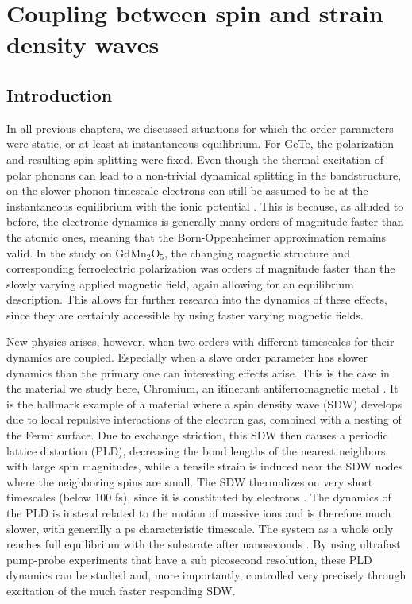 \chapter{Coupling between spin and strain density waves \label{ch:CrSDW}}
\section{Introduction}
In all previous chapters, we discussed situations for which the order parameters were static, or at least at instantaneous equilibrium.
For GeTe, the polarization and resulting spin splitting were fixed.
Even though the thermal excitation of polar phonons can lead to a non-trivial dynamical splitting in the bandstructure, on the slower phonon timescale electrons can still be assumed to be at the instantaneous equilibrium with the ionic potential \cite{Monserrat2017}.
This is because, as alluded to before, the electronic dynamics is generally many orders of magnitude faster than the atomic ones, meaning that the Born-Oppenheimer approximation remains valid.
In the study on GdMn$_2$O$_5$, the changing magnetic structure and corresponding ferroelectric polarization was orders of magnitude faster than the slowly varying applied magnetic field, again allowing for an equilibrium description.
This allows for further research into the dynamics of these effects, since they are certainly accessible by using faster varying magnetic fields.

New physics arises, however, when two orders with different timescales for their dynamics are coupled.
Especially when a slave order parameter has slower dynamics than the primary one can interesting effects arise.
This is the case in the material we study here, Chromium, an itinerant antiferromagnetic metal \cite{Kulikov1984,Fawcett1988}.
It is the hallmark example of a material where a spin density wave (SDW) develops due to local repulsive interactions of the electron gas, combined with a nesting of the Fermi surface.
Due to exchange striction, this SDW then causes a periodic lattice distortion (PLD), decreasing the bond lengths of the nearest neighbors with large spin magnitudes, while a tensile strain is induced near the SDW nodes where the neighboring spins are small. 
The SDW thermalizes on very short timescales (below 100 fs), since it is constituted by electrons \cite{Nicholson2016}.
The dynamics of the PLD is instead related to the motion of massive ions and is therefore much slower, with generally a ps characteristic timescale.
The system as a whole only reaches full equilibrium with the substrate after nanoseconds \cite{Singer2015prb}. 
By using ultrafast pump-probe experiments that have a sub picosecond resolution, these PLD dynamics can be studied and, more importantly, controlled very precisely through excitation of the much faster responding SDW.

